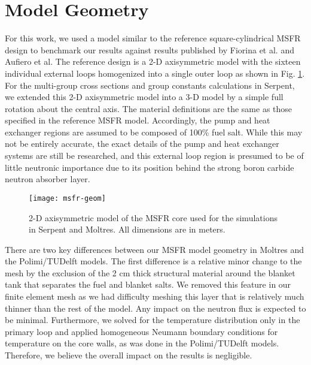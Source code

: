 \section{Model Geometry}

For this work, we used a model similar to the reference square-cylindrical
\gls{MSFR} design to benchmark our results against results published by
Fiorina et al. and Aufiero et al. The reference design is a 2-D axisymmetric
model with the sixteen individual external loops homogenized into a single
outer loop as shown in Fig. \ref{fig:msfrgeom}. For the multi-group
cross sections and group constants calculations in Serpent, we extended this
2-D axisymmetric model into a 3-D model by a simple full rotation about the
central axis. The material definitions are the same as those specified in the
reference \gls{MSFR} model. Accordingly, the pump and heat exchanger regions
are assumed to be composed of 100\% fuel salt. While this may not be entirely
accurate, the exact details of the pump and heat exchanger systems are still
be researched, and this external loop region is presumed to be of little
neutronic importance due to its position behind the strong boron carbide
neutron absorber layer.
%
\begin{figure}[htb!] 
	\centering
	\texttt{[image: msfr-geom]}
	\caption{2-D axisymmetric model of the \gls{MSFR} core used for the
	simulations in Serpent and Moltres. All dimensions are in meters.
	\cite{brovchenko_neutronic_2019}}
	\label{fig:msfrgeom}
\end{figure}

There are two key differences between our \gls{MSFR} model geometry in
Moltres and the Polimi/TUDelft models. The first difference is a relative
minor change to the mesh by the exclusion of the 2 cm thick structural
material around the blanket tank that separates the fuel and blanket salts.
We removed this feature in our finite element mesh as we had difficulty
meshing this layer that is relatively much thinner than the rest of the model.
Any impact on the
neutron flux is expected to be minimal. Furthermore, we solved for the
temperature distribution only in the primary loop and applied homogeneous
Neumann boundary conditions for temperature on the core walls, as was done in
the Polimi/TUDelft models. Therefore, we believe the overall impact on the
results is negligible.

